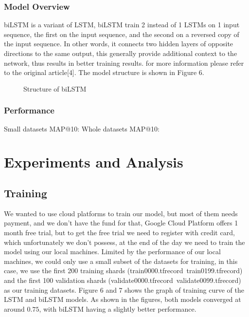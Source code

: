 \documentclass{article}
\begin{document}
\subsubsection{Model Overview}
biLSTM is a variant of LSTM, biLSTM train 2 instead of 1 LSTMs on 1 input sequence, the first on the input sequence, and the second on a reversed copy of the input sequence. In other words, it connects two hidden layers of opposite directions to the same output, this generally provide additional context to the network, thus results in better training results. for more information please refer to the original article[4]. The model structure is shown in Figure 6.
\begin{figure}[h]
  \centering
  \caption{Structure of biLSTM}
\end{figure}
\subsubsection{Performance}
Small datasets MAP@10: 
Whole datasets MAP@10: 


\section{Experiments and Analysis}
\subsection{Training}
We wanted to use cloud platforms to train our model, but most of them needs payment, and we don't have the fund for that, Google Cloud Platform offers 1 month free trial, but to get the free trial we need to register with credit card, which unfortunately we don't possess, at the end of the day we need to train the model using our local machines. Limited by the performance of our local machines, we could only use a small subset of the datasets for training, in this case, we use the first 200 training shards (train0000.tfrecord~train0199.tfrecord) and the first 100 validation shards (validate0000.tfrecord~validate0099.tfrecord) as our training datasets. Figure 6 and 7 shows the graph of training curve of the LSTM and biLSTM models. As shown in the figures, both models converged at around $0.75$, with biLSTM having a slightly better performance.
\end{document}
